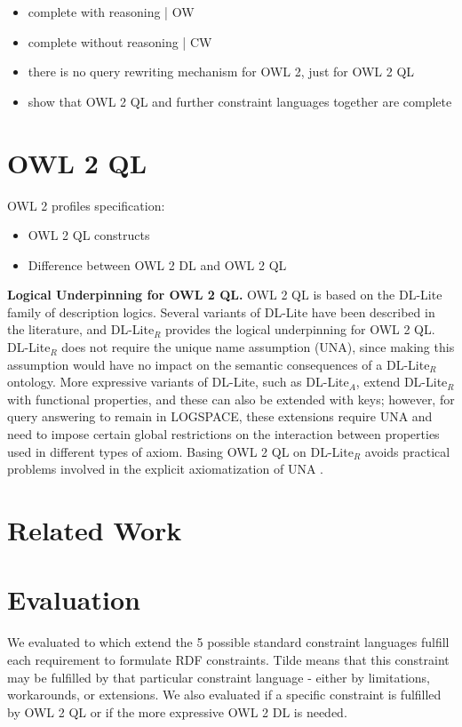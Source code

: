 \documentclass{llncs}
\newcommand{\tb}[1]{\todo[size=\small, color=green!40]{\textbf{Thomas:} #1}}
\begin{document}
\begin{itemize}
	\item complete with reasoning | OW
	\item complete without reasoning | CW
	\item there is no query rewriting mechanism for OWL 2, just for OWL 2 QL
	\item show that OWL 2 QL and further constraint languages together are complete
\end{itemize}

\section{OWL 2 QL}

OWL 2 profiles specification: \cite{owl2profiles2008}

\begin{itemize}
  \item OWL 2 QL constructs
	\item Difference between OWL 2 DL and OWL 2 QL
\end{itemize}

\textbf{Logical Underpinning for OWL 2 QL.}
OWL 2 QL is based on the DL-Lite family of description logics. Several variants of DL-Lite have been described in the literature, and DL-Lite$_R$ provides the logical underpinning for OWL 2 QL. DL-Lite$_R$ does not require the unique name assumption (UNA), since making this assumption would have no impact on the semantic consequences of a DL-Lite$_R$ ontology. More expressive variants of DL-Lite, such as DL-Lite$_A$, extend DL-Lite$_R$ with functional properties, and these can also be extended with keys; however, for query answering to remain in LOGSPACE, these extensions require UNA and need to impose certain global restrictions on the interaction between properties used in different types of axiom. Basing OWL 2 QL on DL-Lite$_R$ avoids practical problems involved in the explicit axiomatization of UNA \cite{owl2profiles2008}. 

\section{Related Work}

\section{Evaluation}

We evaluated to which extend the 5 possible standard constraint languages fulfill each requirement to formulate RDF constraints.
Tilde means that this constraint may be fulfilled by that particular constraint language - either by limitations, workarounds, or extensions.
We also evaluated if a specific constraint is fulfilled by OWL 2 QL or if the more expressive OWL 2 DL is needed. 

\tb{ToDO: insert evaluation table}

{}

\setcounter{tocdepth}{1}
\end{document}
